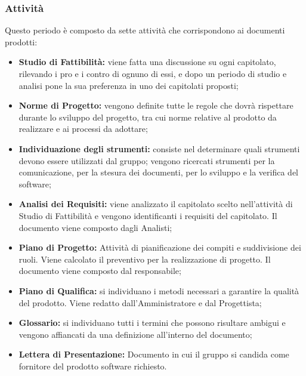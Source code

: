 \subsubsection{Attività}
Questo periodo è composto da sette attività che corrispondono ai documenti prodotti:
\begin{itemize}
	\item \textbf{Studio di Fattibilità:} viene fatta una discussione su ogni capitolato, rilevando i pro e i contro di ognuno di essi, e dopo un periodo di studio e analisi \Gruppo{} pone la sua preferenza in uno dei capitolati proposti;
	\item \textbf{Norme di Progetto:} vengono definite tutte le regole che \Gruppo{} dovrà rispettare durante lo sviluppo del progetto, tra cui norme relative al prodotto da realizzare e ai processi da adottare;
	\item \textbf{Individuazione degli strumenti:} consiste nel determinare quali strumenti devono essere utilizzati dal gruppo; vengono ricercati strumenti per la comunicazione, per la stesura dei documenti, per lo sviluppo e la verifica del software;
	\item \textbf{Analisi dei Requisiti:} viene analizzato il capitolato scelto nell'attività di Studio di Fattibilità e vengono identificanti i requisiti del capitolato. Il documento viene composto dagli Analisti;
	\item \textbf{Piano di Progetto:} Attività di pianificazione dei compiti e suddivisione dei ruoli. Viene calcolato il preventivo per la realizzazione di progetto. Il documento viene composto dal responsabile;
	\item \textbf{Piano di Qualifica:} si individuano i metodi necessari a garantire la qualità del prodotto. Viene redatto dall'Amministratore e dal Progettista;
	\item\textbf{Glossario:} si individuano tutti i termini che possono risultare ambigui e vengono affiancati da una definizione all'interno del documento;  
	\item \textbf{Lettera di Presentazione:} Documento in cui il gruppo \Gruppo{} si candida come fornitore del prodotto software richiesto.
\end{itemize}
